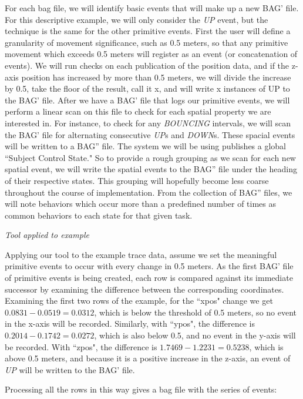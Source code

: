 For each bag file, we will identify basic events that will make up a new BAG' file.  
For this descriptive example, we will only consider the \emph{UP} event, but the technique is the same for the other primitive events.  
First the user will define a granularity of movement significance, such as 0.5 meters, so that any primitive movement which exceeds 0.5 meters will register as an event (or concatenation of events).
We will run checks on each publication of the position data, and if the z-axis position has increased by more than 0.5 meters, we will divide the increase by 0.5, take the floor of the result, call it x, and will write x instances of UP to the BAG' file.  
After we have a BAG' file that logs our primitive events, we will perform a linear scan on this file to check for each spatial property we are interested in.  
For instance, to check for any \emph{BOUNCING} intervals, we will scan the BAG' file for alternating consecutive \emph{UP}s and \emph{DOWN}s. 
These spacial events will be written to a BAG'' file.
The system we will be using publishes a global ``Subject Control State."
So to provide a rough grouping as we scan for each new spatial event, we will write the spatial events to the BAG'' file under the heading of their respective states.
This grouping will hopefully become less coarse throughout the course of implementation.
From the collection of BAG'' files, we will note behaviors which occur more than a predefined number of times as common behaviors to each state for that given task.

\emph{Tool applied to example}

Applying our tool to the example trace data, assume we set the meaningful primitive events to occur with every change in 0.5 meters. 
As the first BAG' file of primitive events is being created, each row is compared against its immediate successor by examining the difference between the corresponding coordinates.
Examining the first two rows of the example, for the ``xpos" change we get $0.0831-0.0519=0.0312$, which is below the threshold of 0.5 meters, so no event in the x-axis will be recorded.  
Similarly, with ``ypos", the difference is $0.2014-0.1742=0.0272$, which is also below 0.5, and no event in the y-axis will be recorded.
With ``zpos", the difference is $1.7469-1.2231=0.5238$, which is above 0.5 meters, and because it is a positive increase in the z-axis, an event of \emph{UP} will be written to the BAG' file.

Processing all the rows in this way gives a bag file with the series of events: 

